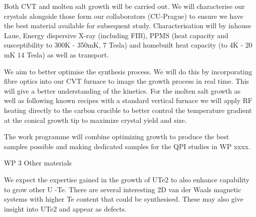 Both CVT and molten salt growth will be carried out. We will characterise our crystals alongside those form our collaborators (CU-Prague) to ensure we have the best material available for subsequent study. Characterisation will  by inhouse Laue, Energy dispersive X-ray (including FIB), PPMS (heat capacity and susceptibility to 300K - 350mK, 7 Tesla) and homebuilt heat capacity (to 4K - 20 mK 14 Tesla) as well as transport.

We aim to better optimise the synthesis process. We will do this by incorporating fibre optics into our CVT furnace to image the growth process in real time. This will give a better understanding of the kinetics. For the molten salt growth as well as following known recipes with a standard vertical furnace we will apply RF heating directly to the carbon crucible to better control the temperature gradient at the conical growth tip to maximize crystal yield and size.

The work programme will combine optimizing growth to produce the best samples possible and making dedicated samples for the QPI studies in WP xxxx.

WP 3 Other materials

We expect the expertise gained in the growth of UTe2 to also enhance capability to grow other U -Te.  There are several interesting 2D van der Waals magnetic systems with higher Te content that could be synthesised. These may also give insight into UTe2 and appear as defects.

  
  
